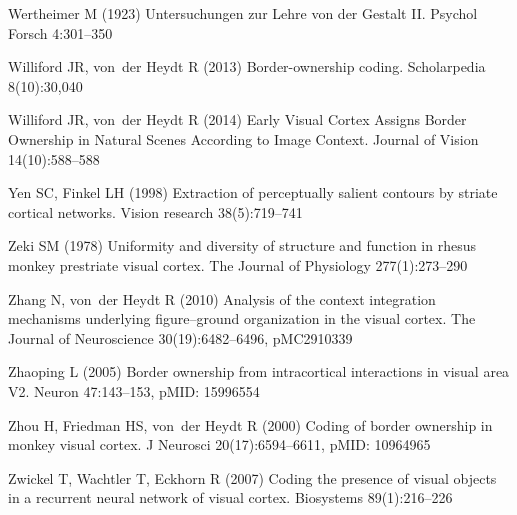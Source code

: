 \begin{thebibliography}{90}
Wertheimer M (1923) {U}ntersuchungen zur {Lehre von der Gestalt II}. Psychol
  Forsch 4:301--350

Williford JR, von~der Heydt R (2013) {B}order-ownership coding. Scholarpedia
  8(10):30,040

Williford JR, von~der Heydt R (2014) {E}arly {V}isual {C}ortex {A}ssigns
  {B}order {O}wnership in {N}atural {S}cenes {A}ccording to {I}mage {C}ontext.
  Journal of Vision 14(10):588--588

Yen SC, Finkel LH (1998) {E}xtraction of perceptually salient contours by
  striate cortical networks. Vision research 38(5):719--741

Zeki SM (1978) {U}niformity and diversity of structure and function in rhesus
  monkey prestriate visual cortex. The Journal of Physiology 277(1):273--290

Zhang N, von~der Heydt R (2010) {A}nalysis of the context integration
  mechanisms underlying figure--ground organization in the visual cortex. The
  Journal of Neuroscience 30(19):6482--6496, pMC2910339

Zhaoping L (2005) {B}order ownership from intracortical interactions in visual
  area {V2}. Neuron 47:143--153, pMID: 15996554

Zhou H, Friedman HS, von~der Heydt R (2000) {C}oding of border ownership in
  monkey visual cortex. J Neurosci 20(17):6594--6611, pMID: 10964965

Zwickel T, Wachtler T, Eckhorn R (2007) Coding the presence of visual objects
  in a recurrent neural network of visual cortex. Biosystems 89(1):216--226

\end{thebibliography}

\clearpage


\onecolumn
\appendix
{} %
\renewcommand\theequation{S\arabic{equation}}    
\setcounter{equation}{0}  
\renewcommand{\thefigure}{S\arabic{figure}} %
\setcounter{figure}{0}  %
